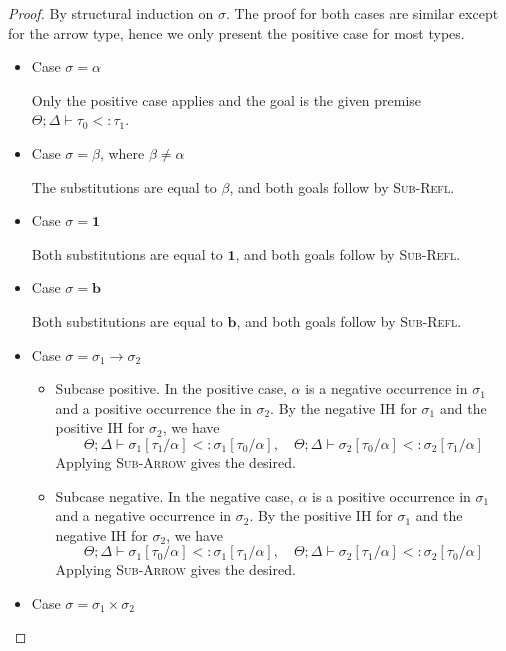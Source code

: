 \begin{proof}
By structural induction on $\sigma$.
The proof for both cases are similar except for the arrow type, hence we only present the positive case for most types.

\begin{itemize}
\item Case $\sigma=\alpha$

Only the positive case applies and the goal is the given premise $\Theta;\Delta\vdash\tau_0<:\tau_1$.

\item Case $\sigma=\beta$, where $\beta\neq\alpha$

The substitutions are equal to $\beta$, and both goals follow by \textsc{Sub-Refl}.

\item Case $\sigma=\textbf{1}$

Both substitutions are equal to $\textbf{1}$, and both goals follow by \textsc{Sub-Refl}.

\item Case $\sigma=\textbf{b}$

Both substitutions are equal to $\textbf{b}$, and both goals follow by \textsc{Sub-Refl}.

\item Case $\sigma=\sigma_1\to\sigma_2$

\begin{itemize}
\item Subcase positive.
In the positive case, $\alpha$ is a negative occurrence in $\sigma_1$ and a positive occurrence the in $\sigma_2$. By the negative IH for $\sigma_1$ and the positive IH for
$\sigma_2$, we have
\[
  \Theta;\Delta\vdash\sigma_1[\tau_1/\alpha]<:\sigma_1[\tau_0/\alpha],
  \quad
  \Theta;\Delta\vdash\sigma_2[\tau_0/\alpha]<:\sigma_2[\tau_1/\alpha]
\]
Applying \textsc{Sub-Arrow} gives the desired.

\item Subcase negative.
In the negative case, $\alpha$ is a positive occurrence in $\sigma_1$ and a negative occurrence in $\sigma_2$.
By the positive IH for $\sigma_1$ and the negative IH for
$\sigma_2$, we have
\[
  \Theta;\Delta\vdash\sigma_1[\tau_0/\alpha]<:\sigma_1[\tau_1/\alpha],
  \quad
  \Theta;\Delta\vdash\sigma_2[\tau_1/\alpha]<:\sigma_2[\tau_0/\alpha]
\]
Applying \textsc{Sub-Arrow} gives the desired.
\end{itemize}

\item Case $\sigma=\sigma_1\times\sigma_2$


\end{itemize}
\end{proof}
